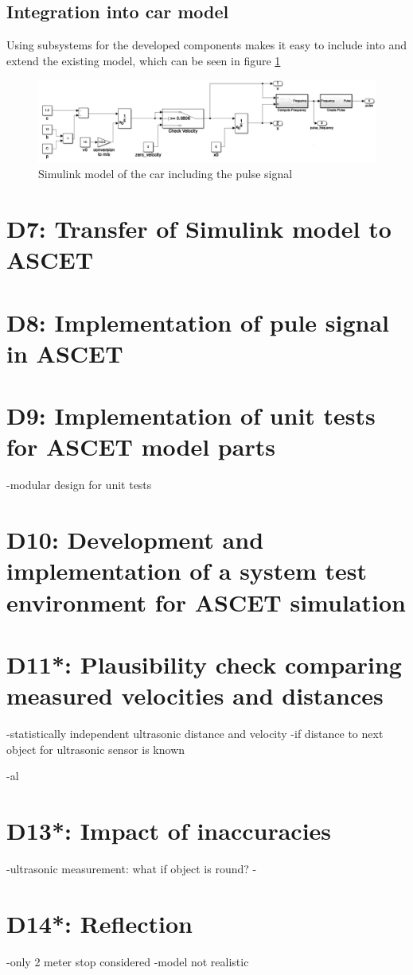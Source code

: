 \section{Integration into car model}\label{sec:D6Frequency}
Using subsystems for the developed components makes it easy to include into and extend the existing model, which can be seen in figure \ref{fig:D6_Integation}
\begin{figure}[H]
\centering
\includegraphics[width=1\textwidth]{images/D6_integration.png}
\caption{Simulink model of the car including the pulse signal}
\label{fig:D6_Integation}
\end{figure}

\chapter{D7: Transfer of Simulink model to ASCET}\label{cha:D7}

\chapter{D8: Implementation of pule signal in ASCET}\label{cha:D8}

\chapter{D9: Implementation of unit tests for ASCET model parts}\label{cha:D9}
-modular design for unit tests
\chapter{D10: Development and implementation of a system test environment for ASCET simulation}\label{cha:D10}

\chapter{D11*: Plausibility check comparing measured velocities and distances}\label{cha:D11}
-statistically independent ultrasonic distance and velocity
-if distance to next object for ultrasonic sensor is known

-al
\chapter{D13*: Impact of inaccuracies}\label{cha:D13}
-ultrasonic measurement: what if object is round?
-
\chapter{D14*: Reflection}\label{cha:D14}
-only 2 meter stop considered
-model not realistic